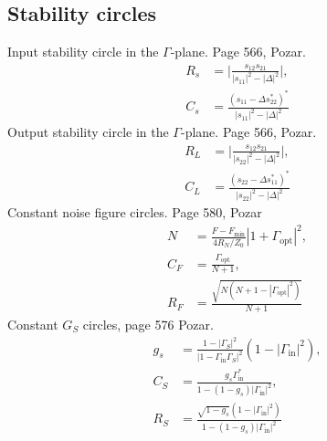 \documentclass[12pt,a4paper]{article}
\begin{document}
\subsection{Stability circles}
Input stability circle in the $\Gamma$-plane. Page 566, Pozar.
\begin{subequations}
  \label{eq:stab_input}
  \begin{align}
    R_s &= \bigg|\frac{s_{12}s_{21}}{|s_{11}|^2 - |\Delta|^2}\biggl|, \\
    C_s &= \frac{(s_{11} - \Delta s_{22}^*)^*}{|s_{11}|^2 - |\Delta|^2}
  \end{align}
\end{subequations}
Output stability circle in the $\Gamma$-plane. Page 566, Pozar.
\begin{subequations}
  \label{eq:stab_output}
  \begin{align}
    R_L &= \bigg|\frac{s_{12}s_{21}}{|s_{22}|^2 - |\Delta|^2}\biggl|, \\
    C_L &= \frac{(s_{22} - \Delta s_{11}^*)^*}{|s_{22}|^2 - |\Delta|^2}
  \end{align}
\end{subequations}
Constant noise figure circles. Page 580, Pozar
\begin{subequations}
  \label{eq:const_noise}
  \begin{align}
    N &= \frac{F - F_\text{min}}{4R_N/Z_0}|1+\Gamma_\text{opt}|^2, \\
    C_F &= \frac{\Gamma_\text{opt}}{N + 1}, \\
    R_F &= \frac{\sqrt{N(N + 1 - |\Gamma_\text{opt}|^2)}}{N + 1}
  \end{align}
\end{subequations}
Constant $G_S$ circles, page 576 Pozar.
\begin{subequations}
  \label{eq:const_gain}
  \begin{align}
    g_s &= \frac{1-|\Gamma_S|^2}{|1-\Gamma_\text{in}\Gamma_S|^2}(1-|\Gamma_\text{in}|^2), \\
    C_S &= \frac{g_s\Gamma_\text{in}^*}{1 - (1 - g_s)|\Gamma_\text{in}|^2}, \\
    R_S &= \frac{\sqrt{1-g_s}(1-|\Gamma_\text{in}|^2)}{1 - (1 - g_s)|\Gamma_\text{in}|^2}
  \end{align}
\end{subequations}
\end{document}
